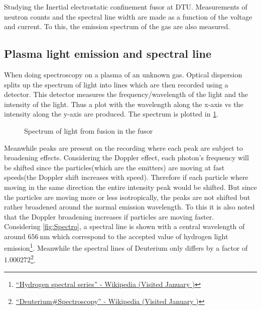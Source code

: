 Studying the Inertial electrostatic confinement fusor at DTU. Measurements of neutron counts and the spectral line width are made as a function of the voltage and current. To this, the emission spectrum of the gas are also measured.
\subsection{Plasma light emission and spectral line}
When doing spectroscopy on a plasma of an unknown gas. Optical dispersion splits up the spectrum of light into lines which are then recorded using a detector. This detector measures the frequency/wavelength of the light and the intensity of the light. Thus a plot with the wavelength along the x-axis vs the intensity along the y-axis are produced. The spectrum is plotted in \cref{SPEC}.
\begin{figure}[H]
	\centering
	\caption{Spectrum of light from fusion in the fusor}
	\label{SPEC}
\end{figure}
Meanwhile peaks are present on the recording where each peak are subject to broadening effects. Considering the Doppler effect, each photon's frequency will be shifted since the particles(which are the emitters) are moving at fast speeds(the Doppler shift increases with speed). Therefore if each particle where moving in the same direction the entire intensity peak would be shifted. But since the particles are moving more or less isotropically, the peaks are not shifted but rather broadened around the normal emission wavelength. To this it is also noted that the Doppler broadening increases if particles are moving faster.\\
Considering \cref{fig:Spectro}, a spectral line is shown with a central wavelength of around $\SI{656}{\nano\meter}$ which correspond to the accepted value of hydrogen light emission\footnote{\href{https://en.wikipedia.org/wiki/Hydrogen_spectral_series}{``Hydrogen spectral series'' - Wikipedia (Visited January )}}. Meanwhile the spectral lines of Deuterium only differs by a factor of $1.000272$\footnote{\href{https://en.wikipedia.org/wiki/Deuterium#Spectroscopy}{``Deuterium\#Spectroscopy'' - Wikipedia (Visited January )}}.
